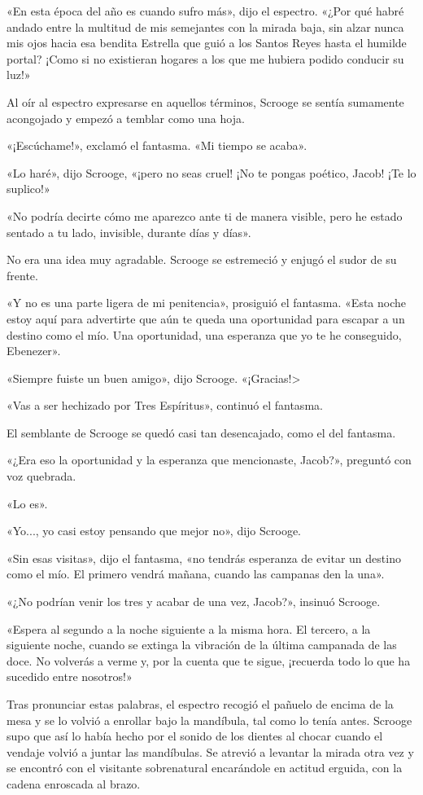 \documentclass{novela}
\begin{document}
 «En esta época del año es cuando sufro más», dijo el espectro. «¿Por qué habré andado entre la multitud de mis semejantes con la mirada baja, sin alzar nunca mis ojos hacia esa bendita Estrella que guió a los Santos Reyes hasta el humilde portal? ¡Como si no existieran hogares a los que me hubiera podido conducir su luz!»

 Al oír al espectro expresarse en aquellos términos, Scrooge se sentía sumamente acongojado y empezó a temblar como una hoja.

 «¡Escúchame!», exclamó el fantasma. «Mi tiempo se acaba».

 «Lo haré», dijo Scrooge, «¡pero no seas cruel! ¡No te pongas poético, Jacob! ¡Te lo suplico!»

 «No podría decirte cómo me aparezco ante ti de manera visible, pero he estado sentado a tu lado, invisible, durante días y días».

 No era una idea muy agradable. Scrooge se estremeció y enjugó el sudor de su frente.

 «Y no es una parte ligera de mi penitencia», prosiguió el fantasma. «Esta noche estoy aquí para advertirte que aún te queda una oportunidad para escapar a un destino como el mío. Una oportunidad, una esperanza que yo te he conseguido, Ebenezer».

 «Siempre fuiste un buen amigo», dijo Scrooge. «¡Gracias!>

 «Vas a ser hechizado por Tres Espíritus», continuó el fantasma.

 El semblante de Scrooge se quedó casi tan desencajado, como el del fantasma.

 «¿Era eso la oportunidad y la esperanza que mencionaste, Jacob?», preguntó con voz quebrada.

 «Lo es».

 «Yo..., yo casi estoy pensando que mejor no», dijo Scrooge.

 «Sin esas visitas», dijo el fantasma, «no tendrás esperanza de evitar un destino como el mío. El primero vendrá mañana, cuando las campanas den la una».

 «¿No podrían venir los tres y acabar de una vez, Jacob?», insinuó Scrooge.

 «Espera al segundo a la noche siguiente a la misma hora. El tercero, a la siguiente noche, cuando se extinga la vibración de la última campanada de las doce. No volverás a verme y, por la cuenta que te sigue, ¡recuerda todo lo que ha sucedido entre nosotros!»

 Tras pronunciar estas palabras, el espectro recogió el pañuelo de encima de la mesa y se lo volvió a enrollar bajo la mandíbula, tal como lo tenía antes. Scrooge supo que así lo había hecho por el sonido de los dientes al chocar cuando el vendaje volvió a juntar las mandíbulas. Se atrevió a levantar la mirada otra vez y se encontró con el visitante sobrenatural encarándole en actitud erguida, con la cadena enroscada al brazo.
\end{document}
